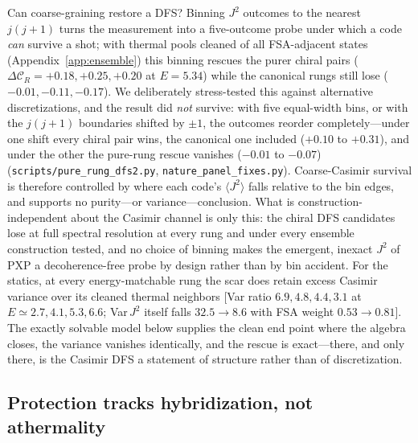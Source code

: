 \documentclass[aps,prb,twocolumn]{revtex4-2}
\newcommand{\CR}{\mathcal{C}_R}
\begin{document}
Can coarse-graining restore a DFS? Binning $J^2$ outcomes to the nearest
$j(j{+}1)$ turns the measurement into a five-outcome probe under which a
code \emph{can} survive a shot; with thermal pools cleaned of all
FSA-adjacent states (Appendix~\ref{app:ensemble}) this binning rescues the
purer chiral pairs ($\Delta\CR=+0.18,+0.25,+0.20$ at $E=5.34$) while the
canonical rungs still lose ($-0.01,-0.11,-0.17$). We deliberately
stress-tested this against alternative discretizations, and the result did
\emph{not} survive: with five equal-width bins, or with the $j(j{+}1)$
boundaries shifted by $\pm1$, the outcomes reorder completely---under one
shift every chiral pair wins, the canonical one included
($+0.10$ to $+0.31$), and under the other the pure-rung rescue vanishes
($-0.01$ to $-0.07$)
(\texttt{scripts/pure\_rung\_dfs2.py}, \texttt{nature\_panel\_fixes.py}).
Coarse-Casimir survival is therefore controlled by where each code's
$\langle J^2\rangle$ falls relative to the bin edges, and supports no
purity---or variance---conclusion. What is construction-independent about
the Casimir channel is only this: the chiral DFS candidates lose at full
spectral resolution at every rung and under every ensemble construction
tested, and no choice of binning makes the emergent, inexact $J^2$ of PXP a
decoherence-free probe by design rather than by bin accident. For the
statics, at every energy-matchable rung the scar does retain excess Casimir
variance over its cleaned thermal neighbors [Var ratio $6.9,4.8,4.4,3.1$ at
$E\simeq2.7,4.1,5.3,6.6$; Var$\,J^2$ itself falls $32.5\to8.6$ with FSA
weight $0.53\to0.81$]. The exactly solvable model below supplies the clean
end point where the algebra closes, the variance vanishes identically, and
the rescue is exact---there, and only there, is the Casimir DFS a
statement of structure rather than of discretization.

\subsection{Protection tracks hybridization, not athermality}
\label{sec:purity}
\end{document}
